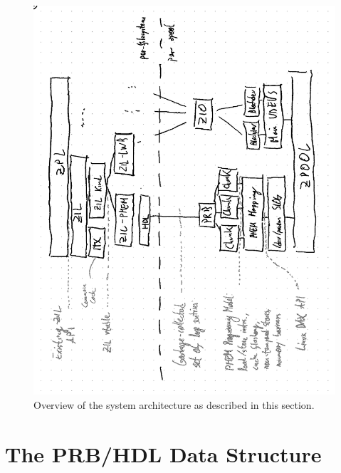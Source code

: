 \documentclass[12pt,a4paper,twoside]{book}
\begin{document}
\begin{figure}[H]
    \includegraphics{fig/zilpmem_architecture_overview}
    \caption{Overview of the system architecture as described in this section.}
\end{figure}

\chapter{The PRB/HDL Data Structure}\label{ch:prbhdl}
\end{document}
